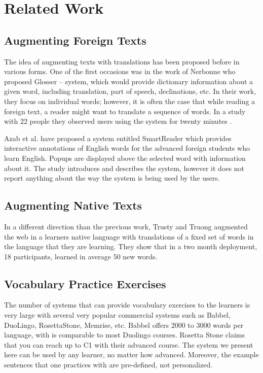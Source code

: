 
\newpage
\section{Related Work}


\subsection{Augmenting Foreign Texts}
The idea of augmenting texts with translations has been proposed before in various forms. One of the first occasions was in the work of Nerbonne \cite{Nerb99-Assistant} who proposed Glosser -- system, which would provide dictionary information about a given word, including translation, part of speech, declinations, etc. In their work, they focus on individual words; however, it is often the case that while reading a foreign text, a reader might want to translate a sequence of words. In a study with 22 people they observed users using the system for twenty minutes \cite{Dokter98-UserStudy}.

Azab et al. \cite{Azab13-nlp} have proposed a system entitled SmartReader which provides interactive annotations of English words for the advanced foreign students who learn English. Popups are displayed above the selected word with information about it. The study introduces and describes the system, however it does not report anything about the way the system is being used by the users.

\subsection{Augmenting Native Texts}
In a different direction than the previous work, Trusty and Truong augmented the web in a learners native language with translations of a fixed set of words in the language that they are learning\cite{Trus11web}. They show that in a two month deployment, 18 participants, learned in average 50 new words.

\subsection{Vocabulary Practice Exercises}
The number of systems that can provide vocabulary exercises to the learners is very large with several very popular commercial systems such as Babbel, DuoLingo, RosettaStone, Memrise, etc. Babbel offers 2000 to 3000 words per language, with is comparable to most Duolingo courses. Rosetta Stone claims that you can reach up to C1 with their advanced course. The system we present here can be used by any learner, no matter how advanced. Moreover, the example sentences that one practices with are pre-defined, not personalized.

